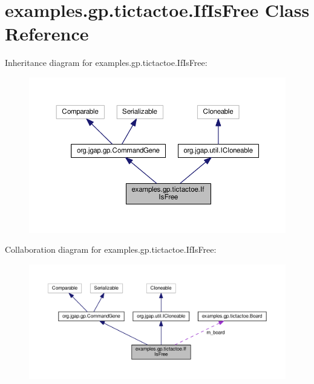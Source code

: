 \hypertarget{classexamples_1_1gp_1_1tictactoe_1_1_if_is_free}{\section{examples.\-gp.\-tictactoe.\-If\-Is\-Free Class Reference}
\label{classexamples_1_1gp_1_1tictactoe_1_1_if_is_free}
}


Inheritance diagram for examples.\-gp.\-tictactoe.\-If\-Is\-Free\-:
\nopagebreak
\begin{figure}[H]
\begin{center}
\leavevmode
\includegraphics[width=350pt]{classexamples_1_1gp_1_1tictactoe_1_1_if_is_free__inherit__graph}
\end{center}
\end{figure}


Collaboration diagram for examples.\-gp.\-tictactoe.\-If\-Is\-Free\-:
\nopagebreak
\begin{figure}[H]
\begin{center}
\leavevmode
\includegraphics[width=350pt]{classexamples_1_1gp_1_1tictactoe_1_1_if_is_free__coll__graph}
\end{center}
\end{figure}

